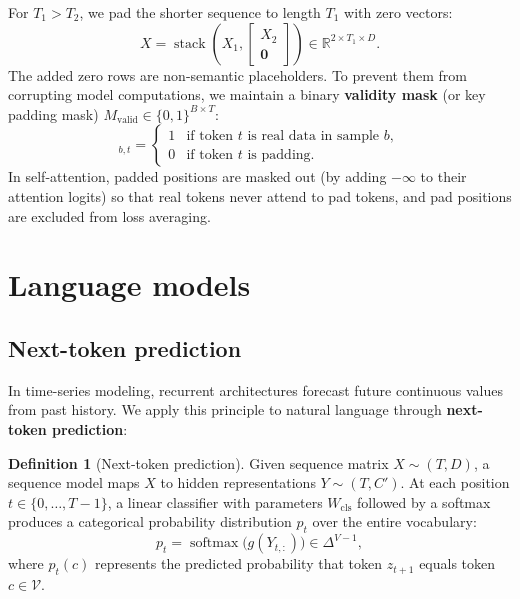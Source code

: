 \documentclass[11pt,a4paper]{article}
\newcommand{\R}{\mathbb{R}}
\DeclareMathOperator{\softmax}{softmax}
\newcommand{\slides}[1]{\par\nopagebreak\noindent{\normalfont\small\emph{(slides #1)}}\par\nopagebreak\vspace{2pt}}
\theoremstyle{definition}
\newtheorem{definition}{Definition}[section]
\theoremstyle{plain}
\begin{document}
For $T_1 > T_2$, we pad the shorter sequence to length $T_1$ with zero vectors:
\begin{equation}
X = \operatorname{stack}\left(X_1, \begin{bmatrix} X_2 \\ \mathbf{0} \end{bmatrix}\right) \in \R^{2 \times T_1 \times D}.
\end{equation}
The added zero rows are non-semantic placeholders. To prevent them from corrupting model computations, we maintain a binary \textbf{validity mask} (or key padding mask) $M_{\text{valid}} \in \{0, 1\}^{B \times T}$:
\begin{equation}
[M_{\text{valid}}]_{b, t} = \begin{cases} 1 & \text{if token } t \text{ is real data in sample } b, \\ 0 & \text{if token } t \text{ is padding.} \end{cases}
\end{equation}
In self-attention, padded positions are masked out (by adding $-\infty$ to their attention logits) so that real tokens never attend to pad tokens, and pad positions are excluded from loss averaging.

\section{Language models}\slides{11--17 / 84}

\subsection{Next-token prediction}\slides{11 / 84}
In time-series modeling, recurrent architectures forecast future continuous values from past history. We apply this principle to natural language through \textbf{next-token prediction}:
\begin{definition}[Next-token prediction]
Given sequence matrix $X \sim (T, D)$, a sequence model maps $X$ to hidden representations $Y \sim (T, C')$. At each position $t \in \{0, \dots, T-1\}$, a linear classifier with parameters $W_{\text{cls}}$ followed by a softmax produces a categorical probability distribution $p_t$ over the entire vocabulary:
\begin{equation}
p_t = \softmax\big(g(Y_{t,:})\big) \in \Delta^{V-1},
\end{equation}
where $p_t(c)$ represents the predicted probability that token $z_{t+1}$ equals token $c \in \mathcal{V}$.
\end{definition}
\end{document}
